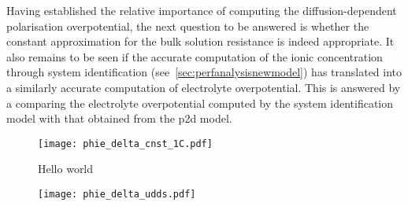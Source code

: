 Having established the relative  importance of computing the diffusion-dependent
polarisation   overpotential,   the   next    question   to   be   answered   is
whether  the  constant  approximation  for   the  bulk  solution  resistance  is
indeed   appropriate.   It  also   remains   to   be   seen  if   the   accurate
computation   of  the   ionic   concentration   through  system   identification
(see~\cref{sec:perfanalysisnewmodel}) has  translated into a  similarly accurate
computation of  electrolyte overpotential. This  is answered by a  comparing the
electrolyte overpotential computed by the  system identification model with that
obtained from the \gls{p2d} model.



\begin{figure}[!htbp]
    \centering
    \texttt{[image: phie\_delta\_cnst\_1C.pdf]}
    \caption{Hello world}
    \label{}
\end{figure}

\begin{figure}[!htbp]
    \centering
    \texttt{[image: phie\_delta\_udds.pdf]}
    \caption{}
    \label{}
\end{figure}




